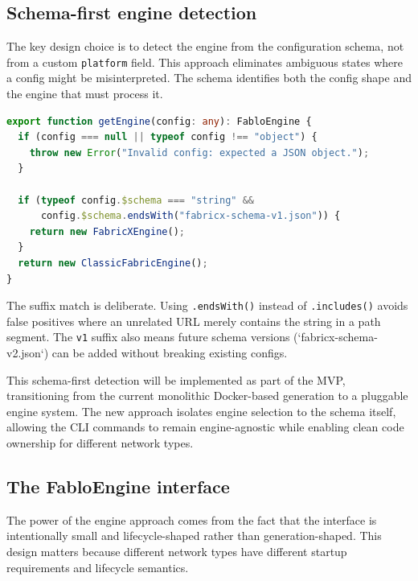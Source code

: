 \subsection{Schema-first engine detection}

The key design choice is to detect the engine from the configuration schema, not from a custom \texttt{platform} field. This approach eliminates ambiguous states where a config might be misinterpreted. The schema identifies both the config shape and the engine that must process it.

\begin{tcolorbox}[colback=gray!5!white, colframe=gray!50!black,
  title=Engine detection logic (\texttt{src/engines/engine-loader.ts}),
  fonttitle=\bfseries, arc=4pt]
\begin{lstlisting}[language=typescript, basicstyle=\ttfamily\small,
  keywordstyle=\color{blue}, stringstyle=\color{orange}]
export function getEngine(config: any): FabloEngine {
  if (config === null || typeof config !== "object") {
    throw new Error("Invalid config: expected a JSON object.");
  }

  if (typeof config.$schema === "string" &&
      config.$schema.endsWith("fabricx-schema-v1.json")) {
    return new FabricXEngine();
  }
  return new ClassicFabricEngine();
}
\end{lstlisting}
\end{tcolorbox}

The suffix match is deliberate. Using \texttt{.endsWith()} instead of \texttt{.includes()} avoids false positives where an unrelated URL merely contains the string in a path segment. The \texttt{v1} suffix also means future schema versions (`fabricx-schema-v2.json`) can be added without breaking existing configs.

This schema-first detection will be implemented as part of the MVP, transitioning from the current monolithic Docker-based generation to a pluggable engine system. The new approach isolates engine selection to the schema itself, allowing the CLI commands to remain engine-agnostic while enabling clean code ownership for different network types.

\subsection{The FabloEngine interface}

The power of the engine approach comes from the fact that the interface is intentionally small and lifecycle-shaped rather than generation-shaped. This design matters because different network types have different startup requirements and lifecycle semantics.

